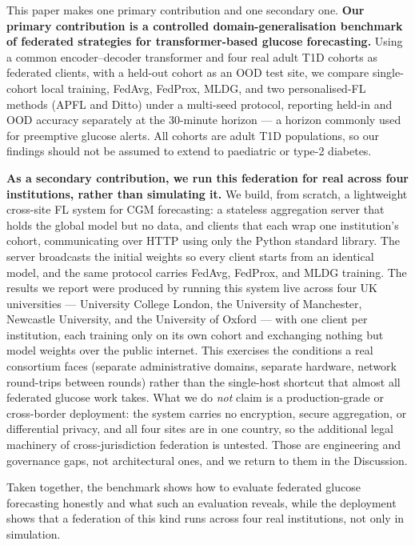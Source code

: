 \documentclass[10pt,letterpaper]{article}
\begin{document}
This paper makes one primary contribution and one secondary one. \textbf{Our
primary contribution is a controlled domain-generalisation benchmark of federated
strategies for transformer-based glucose forecasting.} Using a common
encoder--decoder transformer and four real adult T1D cohorts as federated
clients, with a held-out cohort as an OOD test site, we compare single-cohort
local training, FedAvg, FedProx, MLDG, and two personalised-FL methods (APFL and
Ditto) under a multi-seed protocol, reporting held-in and OOD accuracy separately
at the 30-minute horizon --- a horizon commonly used for preemptive glucose
alerts. All cohorts are adult T1D populations, so our findings should not be
assumed to extend to paediatric or type-2 diabetes.

\textbf{As a secondary contribution, we run this federation for real across four
institutions, rather than simulating it.} We build, from scratch, a lightweight
cross-site FL system for CGM forecasting: a stateless aggregation server that
holds the global model but no data, and clients that each wrap one institution's
cohort, communicating over HTTP using only the Python standard library. The server
broadcasts the initial weights so every client starts from an identical model, and
the same protocol carries FedAvg, FedProx, and MLDG training. The results we
report were produced by running this system live across four UK universities ---
University College London, the University of Manchester, Newcastle University, and
the University of Oxford --- with one client per institution, each training only on
its own cohort and exchanging nothing but model weights over the public internet.
This exercises the conditions a real consortium faces (separate administrative
domains, separate hardware, network round-trips between rounds) rather than the
single-host shortcut that almost all federated glucose work takes. What we do
\emph{not} claim is a production-grade or cross-border deployment: the system
carries no encryption, secure aggregation, or differential privacy, and all four
sites are in one country, so the additional legal machinery of cross-jurisdiction
federation is untested. Those are engineering and governance gaps, not
architectural ones, and we return to them in the Discussion.

Taken together, the benchmark shows how to evaluate federated glucose forecasting
honestly and what such an evaluation reveals, while the deployment shows that a
federation of this kind runs across four real institutions, not only in
simulation.
\end{document}
